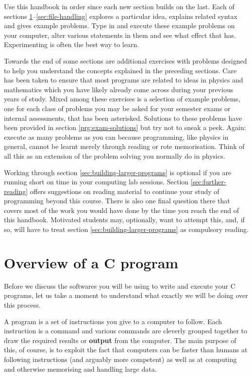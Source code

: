 \documentclass[11pt,oneside]{article}
\newcounter{exercise}
\begin{document}
Use this handbook in order since each new section builds on the last. Each of sections \ref{sec:overview-of-a-c-program}--\ref{sec:file-handling} explores a particular idea, explains related syntax and gives example problems. Type in and execute these example problems on your computer, alter various statements in them and see what effect that has. Experimenting is often the best way to learn.

Towards the end of some sections are additional exercises with problems designed to help you understand the concepts explained in the preceding sections. Care has been taken to ensure that most programs are related to ideas in physics and mathematics which you have likely already come across during your previous years of study. Mixed among these exercises is a selection of example problems, one for each class of problems you may be asked for your semester exams or internal assessments, that has been asterisked. Solutions to these problems have been provided in section \ref{prg:exam-solutions} but try not to sneak a peek. Again: execute as many problems as you can because programming, like physics in general, cannot be learnt merely through reading or rote memorisation. Think of all this as an extension of the problem solving you normally do in physics.

Working through section \ref{sec:building-larger-programs} is optional if you are running short on time in your computing lab sessions. Section \ref{sec:further-reading} offers suggestions on reading material to continue your study of programming beyond this course. There is also one final question there that covers most of the work you would have done by the time you reach the end of this handbook. Motivated students may, optionally, want to attempt this, and, if so, will have to treat section \ref{sec:building-larger-programs} as compulsory reading.

\section{Overview of a C program}\label{sec:overview-of-a-c-program}

Before we discuss the softwares you will be using to write and execute your C programs, let us take a moment to understand what exactly we will be doing over this process.

A program is a set of instructions you give to a computer to follow. Each instruction is a command and various commands are cleverly grouped together to draw the required results or \textbf{output} from the computer. The main purpose of this, of course, is to exploit the fact that computers can be faster than humans at following instructions (and arguably more competent) as well as at computing and otherwise memorising and handling large data.
\end{document}
